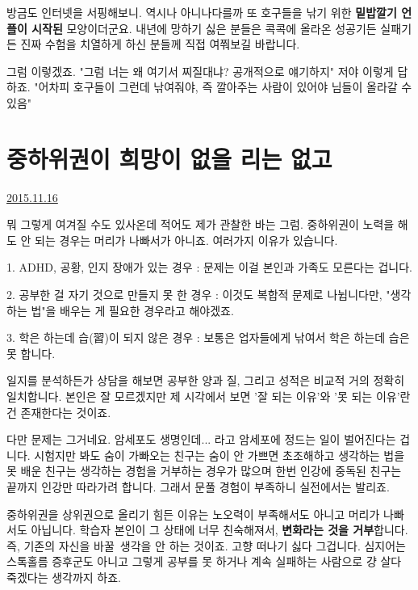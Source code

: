 방금도 인터넷을 서핑해보니.
역시나 아니나다를까 또 호구들을 낚기 위한 \textbf{밑밥깔기 언플이 시작된} 모양이더군요.
내년에 망하기 싫은 분들은 콕콕에 올라온 성공기든 실패기든 진짜 수험을 치열하게 하신 분들께 직접 여쭤보길 바랍니다.
\vspace{5mm}

그럼 이렇겠죠. "그럼 너는 왜 여기서 찌질대냐? 공개적으로 얘기하지"
저야 이렇게 답하죠. "어차피 호구들이 그런데 낚여줘야, 즉 깔아주는 사람이 있어야 님들이 올라갈 수 있음"
\vspace{5mm}






\section{중하위권이 희망이 없을 리는 없고}
\href{https://www.kockoc.com/Apoc/492004}{2015.11.16}

\vspace{5mm}

뭐 그렇게 여겨질 수도 있사온데 적어도 제가 관찰한 바는 그럼.
중하위권이 노력을 해도 안 되는 경우는 머리가 나빠서가 아니죠. 여러가지 이유가 있습니다.
\vspace{5mm}

\item 1. ADHD, 공황, 인지 장애가 있는 경우 : 문제는 이걸 본인과 가족도 모른다는 겁니다.
\item 2. 공부한 걸 자기 것으로 만들지 못 한 경우 : 이것도 복합적 문제로 나뉩니다만, "생각하는 법"을 배우는 게 필요한 경우라고 해야겠죠.
\item 3. 학은 하는데 습(習)이 되지 않은 경우 : 보통은 업자들에게 낚여서 학은 하는데 습은 못 합니다.
\vspace{5mm}

일지를 분석하든가 상담을 해보면
공부한 양과 질, 그리고 성적은 비교적 거의 정확히 일치합니다.
본인은 잘 모르겠지만 제 시각에서 보면 '잘 되는 이유'와 '못 되는 이유'란 건 존재한다는 것이죠.
\vspace{5mm}

다만 문제는 그거네요.
암세포도 생명인데... 라고 암세포에 정드는 일이 벌어진다는 겁니다.
시험지만 봐도 숨이 가빠오는 친구는 숨이 안 가쁘면 초조해하고
생각하는 법을 못 배운 친구는 생각하는 경험을 거부하는 경우가 많으며
한번 인강에 중독된 친구는 끝까지 인강만 따라가려 합니다. 그래서 문풀 경험이 부족하니 실전에서는 발리죠.
\vspace{5mm}

중하위권을 상위권으로 올리기 힘든 이유는
노오력이 부족해서도 아니고 머리가 나빠서도 아닙니다.
학습자 본인이 그 상태에 너무 친숙해져서, \textbf{변화라는 것을 거부}합니다.
즉, 기존의 자신을 바꿀 생각을 안 하는 것이죠. 고향 떠나기 싫다 그겁니다.
심지어는 스톡홀름 증후군도 아니고 그렇게 공부를 못 하거나 계속 실패하는 사람으로 걍 살다 죽겠다는 생각까지 하죠.
\vspace{5mm}

